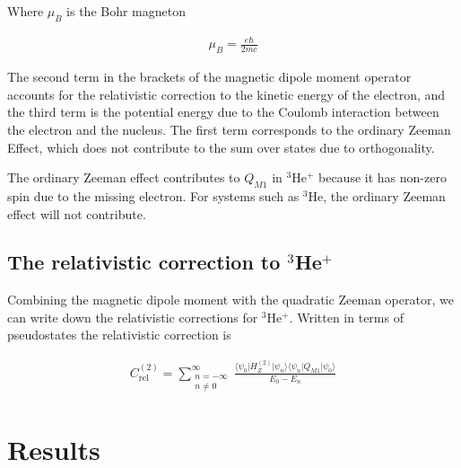             \noindent Where $\mu_B$ is the Bohr magneton
            
            \begin{align}
                \mu_B = \frac{e \hbar}{2mc}
            \end{align}

            \noindent The second term in the brackets of the magnetic dipole moment operator accounts for the relativistic correction to the kinetic energy of the electron, and the third term is the potential energy due to the Coulomb interaction between the electron and the nucleus. The first term corresponds to the ordinary Zeeman Effect, which does not contribute to the sum over states due to orthogonality.

            The ordinary Zeeman effect contributes to $Q_{M1}$ in $^3$He$^+$ because it has non-zero spin due to the missing electron. For systems such as $^3$He, the ordinary Zeeman effect will not contribute.

        \subsection{The relativistic correction to $^3$He$^+$}\label{sec:Relativistic_Correction}
            Combining the magnetic dipole moment with the quadratic Zeeman operator, we can write down the relativistic
            corrections for $^3$He$^+$. Written in terms of pseudostates the relativistic correction is

            \begin{align}
                C_{\text{rel}}^{(2)} =\sum_{\substack{n = -\infty \\ n \neq 0}}^{\infty}
                \frac{\langle \psi_0 \vert H_Z^{(2)} \vert \psi_n \rangle \langle \psi_n \vert Q_{M1} \vert \psi_0 \rangle}{E_0 - E_n}
            \end{align}


    \section{Results}\label{sec:results}





